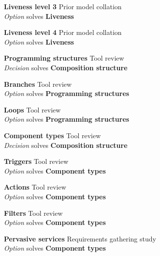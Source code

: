 
\textbf{Liveness level 3} \hfill Prior model collation \cite{Aghaee2012} \\ \emph{Option} \hfill solves \textbf{Liveness}


\textbf{Liveness level 4} \hfill Prior model collation \cite{Aghaee2012} \\ \emph{Option} \hfill solves \textbf{Liveness}


\textbf{Programming structures} \hfill Tool review \\ \emph{Decision} \hfill solves \textbf{Composition structure}

\textbf{Branches} \hfill Tool review \\ \emph{Option} \hfill solves \textbf{Programming structures}

\textbf{Loops} \hfill Tool review \\ \emph{Option} \hfill solves \textbf{Programming structures}

\textbf{Component types} \hfill Tool review \\ \emph{Decision} \hfill solves \textbf{Composition structure}

\textbf{Triggers} \hfill Tool review \\ \emph{Option} \hfill solves \textbf{Component types}

\textbf{Actions} \hfill Tool review \\ \emph{Option} \hfill solves \textbf{Component types}

\textbf{Filters} \hfill Tool review \\ \emph{Option} \hfill solves \textbf{Component types}

\textbf{Pervasive services} \hfill Requirements gathering study \\ \emph{Option} \hfill solves \textbf{Component types}

